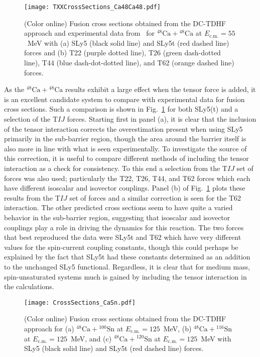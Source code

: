 \documentclass[aps,prc,twocolumn,showpacs,superscriptaddress,longbibliography,floatfix,10pt]{revtex4-1}
\begin{document}
\begin{figure}
	\texttt{[image: TXXCrossSections\_Ca48Ca48.pdf]}
	\caption{(Color online) Fusion cross sections obtained from the DC-TDHF approach and experimental data from~\cite{stefanini2009} for $^{48}\mathrm{Ca}+\mathrm{^{48}Ca}$ at $E_{\mathrm{c.m.}}=55$~MeV with (a) SLy5 (black solid line) and SLy5t (red dashed line) forces and (b) T22 (purple dotted line), T26 (green dash-dotted line), T44 (blue dash-dot-dotted line), and T62 (orange dashed line) forces.
	\label{Fig:CaTXXxsec}}
\end{figure}

As the $^{48}\mathrm{Ca}+\mathrm{^{48}Ca}$ results exhibit a large effect when the tensor force is added, it is an excellent candidate system to compare with experimental data for fusion cross sections.
Such a comparison is shown in Fig.~\ref{Fig:CaTXXxsec} for both SLy5(t) and a selection of the T$IJ$ forces.
Starting first in panel (a), it is clear that the inclusion of the tensor interaction corrects the overestimation present when using SLy5 primarily in the sub-barrier region, though the area around the barrier itself is also more in line with what is seen experimentally.
To investigate the source of this correction, it is useful to compare different methods of including the tensor interaction as a check for consistency.
To this end a selection from the T$IJ$ set of forces was also used; particularly the T22, T26, T44, and T62 forces which each have different isoscalar and isovector couplings.
Panel (b) of Fig.~\ref{Fig:CaTXXxsec} plots these results from the T$IJ$ set of forces and a similar correction is seen for the T62 interaction.
The other predicted cross sections seem to have quite a varied behavior in the sub-barrier region, suggesting that isoscalar and isovector couplings play a role in driving the dynamics for this reaction.
The two forces that best reproduced the data were SLy5t and T62 which have very different values for the spin-current coupling constants, though this could perhaps be explained by the fact that SLy5t had these constants determined as an addition to the unchanged SLy5 functional.
Regardless, it is clear that for medium mass, spin-unsaturated systems much is gained by including the tensor interaction in the calculations.

\begin{figure}
	\texttt{[image: CrossSections\_CaSn.pdf]}
	\caption{(Color online) Fusion cross sections obtained from the DC-TDHF approach for (a) $^{48}\mathrm{Ca}+\mathrm{^{100}Sn}$ at $E_{\mathrm{c.m.}}=125$~MeV, (b) $^{48}\mathrm{Ca}+\mathrm{^{116}Sn}$ at $E_{\mathrm{c.m.}}=125$~MeV, and (c) $^{48}\mathrm{Ca}+\mathrm{^{120}Sn}$ at $E_{\mathrm{c.m.}}=125$~MeV with SLy5 (black solid line) and SLy5t (red dashed line) forces.
		\label{Fig:CaSnxsec}}
\end{figure}
\end{document}
